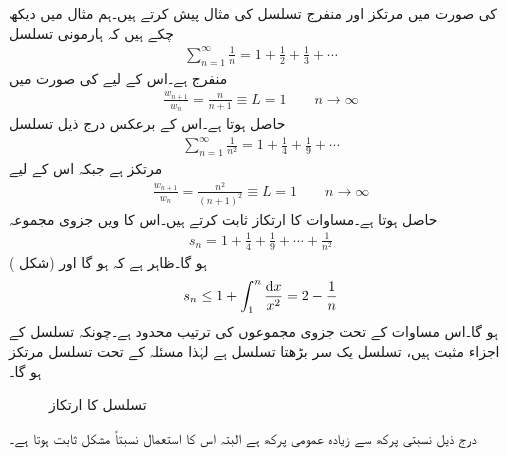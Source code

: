  کی صورت میں مرتکز اور منفرج تسلسل کی مثال پیش کرتے ہیں۔ہم مثال  میں دیکھ چکے ہیں کہ ہارمونی تسلسل 
\begin{align*}
\sum_{n=1}^{\infty} \frac{1}{n}=1+\frac{1}{2}+\frac{1}{3}+\cdots
\end{align*}
منفرج ہے۔اس کے لیے  کی صورت میں
\begin{align*}
\frac{w_{n+1}}{w_n}=\frac{n}{n+1}\equiv L=1 \quad \quad n\to \infty
\end{align*}
حاصل ہوتا ہے۔اس کے برعکس درج ذیل تسلسل
\begin{align}\label{مساوات_ترتیب_تسلسل_مربع_بالعکس}
\sum_{n=1}^{\infty}\frac{1}{n^2}=1+\frac{1}{4}+\frac{1}{9}+\cdots
\end{align}
مرتکز ہے جبکہ اس کے لیے
\begin{align*}
\frac{w_{n+1}}{w_n}=\frac{n^2}{(n+1)^2}\equiv L=1\quad \quad n\to\infty
\end{align*}
حاصل ہوتا ہے۔مساوات  کا ارتکاز ثابت کرتے ہیں۔اس کا  ویں جزوی مجموعہ
\begin{align*}
s_n=1+\frac{1}{4}+\frac{1}{9}+\cdots+\frac{1}{n^2}
\end{align*}
ہو گا۔ظاہر ہے کہ  ہو گا  اور (شکل ) 
\begin{align*}
s_n\le 1+\int_{1}^{n}\frac{\dif x}{x^2}=2-\frac{1}{n}
\end{align*}
ہو گا۔اس مساوات کے تحت جزوی مجموعوں کی ترتیب  محدود ہے۔چونکہ تسلسل کے اجزاء مثبت ہیں، تسلسل یک سر بڑھتا  تسلسل ہے  لہٰذا مسئلہ  کے تحت تسلسل مرتکز ہو گا۔
\begin{figure}
\centering
{}
\caption{تسلسل  کا ارتکاز}
\label{شکل_مساوات_ترتیب_تسلسل_مربع_بالعکس}
\end{figure}

درج ذیل نسبتی پرکھ سے  زیادہ عمومی پرکھ  ہے البتہ اس کا استعمال نسبتاً مشکل ثابت ہوتا ہے۔

